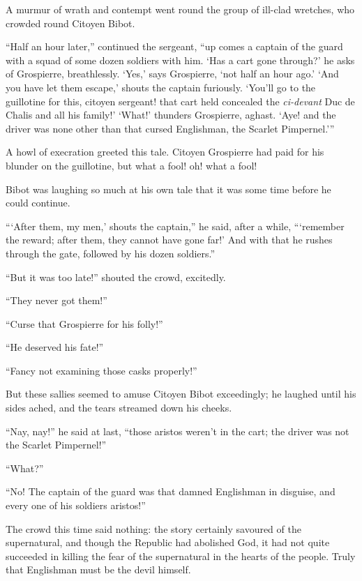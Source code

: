 A murmur of wrath and contempt went round the group of ill-clad wretches, who crowded round Citoyen Bibot.

\enquote{Half an hour later,} continued the sergeant, \enquote{up comes a captain of the guard with a squad of some dozen soldiers with him. \enquote{Has a cart gone through?} he asks of Grospierre, breathlessly. \enquote{Yes,} says Grospierre, \enquote{not half an hour ago.} \enquote{And you have let them escape,} shouts the captain furiously. \enquote{You'll go to the guillotine for this, citoyen sergeant! that cart held concealed the \textit{ci-devant} Duc de Chalis and all his family!} \enquote{What!} thunders Grospierre, aghast. \enquote{Aye! and the driver was none other than that cursed Englishman, the Scarlet Pimpernel.}}

A howl of execration greeted this tale. Citoyen Grospierre had paid for his blunder on the guillotine, but what a fool! oh! what a fool!

Bibot was laughing so much at his own tale that it was some time before he could continue.

\enquote{\enquote{After them, my men,} shouts the captain,} he said, after a while, \enquote{\enquote{remember the reward; after them, they cannot have gone far!} And with that he rushes through the gate, followed by his dozen soldiers.}

\enquote{But it was too late!} shouted the crowd, excitedly.

\enquote{They never got them!}

\enquote{Curse that Grospierre for his folly!}

\enquote{He deserved his fate!}

\enquote{Fancy not examining those casks properly!}

But these sallies seemed to amuse Citoyen Bibot exceedingly; he laughed until his sides ached, and the tears streamed down his cheeks.

\enquote{Nay, nay!} he said at last, \enquote{those aristos weren't in the cart; the driver was not the Scarlet Pimpernel!}

\enquote{What?}

\enquote{No! The captain of the guard was that damned Englishman in disguise, and every one of his soldiers aristos!}

The crowd this time said nothing: the story certainly savoured of the supernatural, and though the Republic had abolished God, it had not quite succeeded in killing the fear of the supernatural in the hearts of the people. Truly that Englishman must be the devil himself.

